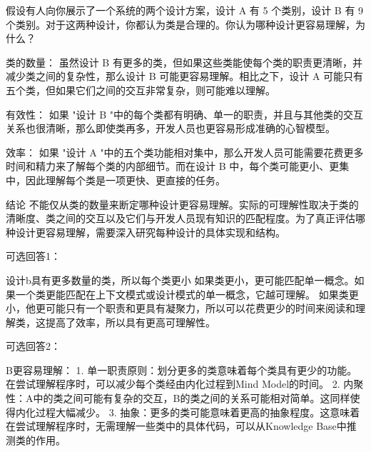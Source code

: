 假设有人向你展示了一个系统的两个设计方案，设计 A 有 5 个类别，设计 B 有 9 个类别。对于这两种设计，你都认为类是合理的。你认为哪种设计更容易理解，为什么？

类的数量： 虽然设计 B 有更多的类，但如果这些类能使每个类的职责更清晰，并减少类之间的复杂性，那么设计 B 可能更容易理解。相比之下，设计 A 可能只有五个类，但如果它们之间的交互非常复杂，则可能难以理解。

有效性： 如果 "设计 B "中的每个类都有明确、单一的职责，并且与其他类的交互关系也很清晰，那么即使类再多，开发人员也更容易形成准确的心智模型。

效率： 如果 "设计 A "中的五个类功能相对集中，那么开发人员可能需要花费更多时间和精力来了解每个类的内部细节。而在设计 B 中，每个类可能更小、更集中，因此理解每个类是一项更快、更直接的任务。

结论 不能仅从类的数量来断定哪种设计更容易理解。实际的可理解性取决于类的清晰度、类之间的交互以及它们与开发人员现有知识的匹配程度。为了真正评估哪种设计更容易理解，需要深入研究每种设计的具体实现和结构。

可选回答1：

设计b具有更多数量的类，所以每个类更小
如果类更小，更可能匹配单一概念。如果一个类更能匹配在上下文模式或设计模式的单一概念，它越可理解。
如果类更小，他更可能只有一个职责和更具有凝聚力，所以可以花费更少的时间来阅读和理解类，这提高了效率，所以具有更高可理解性。

可选回答2：

B更容易理解：
1. 单一职责原则：划分更多的类意味着每个类具有更少的功能。在尝试理解程序时，可以减少每个类经由内化过程到Mind Model的时间。
2. 内聚性：A中的类之间可能有复杂的交互，B的类之间的关系可能相对简单。这同样使得内化过程大幅减少。
3. 抽象：更多的类可能意味着更高的抽象程度。这意味着在尝试理解程序时，无需理解一些类中的具体代码，可以从Knowledge Base中推测类的作用。